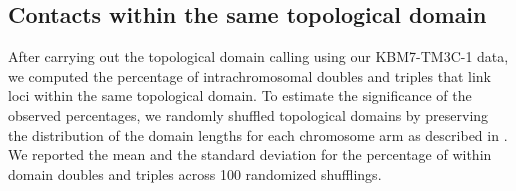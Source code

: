 \subsection*{Contacts within the same topological domain}
After carrying out the topological domain calling using our KBM7-TM3C-1 data,
we computed the percentage of intrachromosomal doubles and triples that
link loci within the same topological domain.
To estimate the significance of the observed percentages, we randomly
shuffled topological domains by preserving the distribution of
the domain lengths for each chromosome arm as described in
 \citet{ay:statistical}. We reported the mean and the standard deviation
for the percentage of within domain doubles and triples across 100
randomized shufflings.


%


